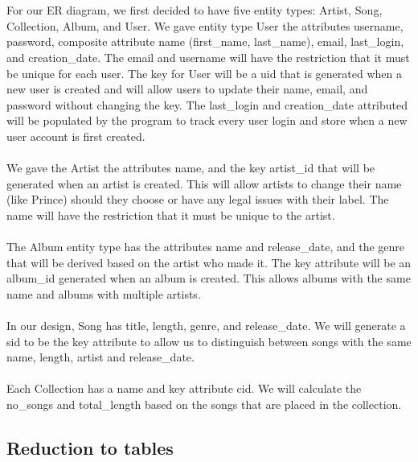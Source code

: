 \documentclass[12pt]{article}
\begin{document}
    \\~\\
    For our ER diagram, we first decided to have five entity types:
    Artist, Song, Collection, Album, and User. We gave entity type User the attributes
    username, password, composite attribute name (first\_name, last\_name), email,
    last\_login, and creation\_date. The email and username will have the restriction that it must be unique
    for each user. The key for User will be a uid that is generated when a new user is
    created and will allow users to update their name, email, and password without
    changing the key. The last\_login and creation\_date attributed will be populated by the program
    to track every user login and store when a new user account is first created.
    \\~\\
    We gave the Artist the attributes name, and the key artist\_id that
    will be generated when an artist is created. This will allow artists to change their
    name (like Prince) should they choose or have any legal issues with their label. The
    name will have the restriction that it must be unique to the artist.
    \\~\\
    The Album entity type has the attributes name and release\_date, and the
    genre that will be derived based on the artist who made it. The key
    attribute will be an album\_id generated when an album is created. This allows albums
    with the same name and albums with multiple artists.
    \\~\\
    In our design, Song has title, length, genre, and release\_date. We will
    generate a sid to be the key attribute to allow us to distinguish between songs with
    the same name, length, artist and release\_date.
    \\~\\
    Each Collection has a name and key attribute cid. We will calculate
    the no\_songs and total\_length based on the songs that are placed in the collection.

    \subsection{Reduction to tables}
\end{document}
